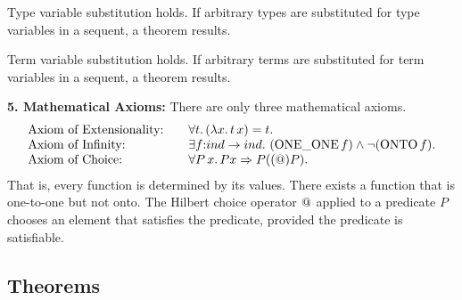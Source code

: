 \documentclass{llncs}
\def\op#1{{\hbox{#1}}} %
\def\tc{\hbox{:}}
\begin{document}
{{Type variable substitution holds.  If arbitrary types are substituted for type variables in a sequent, a theorem results.

Term variable substitution holds.  If arbitrary terms are substituted for term variables in a sequent, a theorem results.



\bigskip
{\bf 5. Mathematical Axioms:} There are only three mathematical axioms.
$$\begin{array}{lll}
\hbox{Axiom of Extensionality:} &\quad\forall t.\, (\lambda x.\, t\, x) = t.\\
\hbox{Axiom of Infinity:} &\quad\exists f\tc ind\to ind.\ (\op{ONE\_ONE}\,f) \land \neg(\op{ONTO}\, f).\\
\hbox{Axiom of Choice:}&\quad  \forall P\,x.\, P x \Rightarrow  P((\hbox{@}) P).\\
\end{array}
$$
That is, every function is determined by its values. There exists a function that is one-to-one but not onto.  The Hilbert choice operator $\hbox{@}$ applied to a predicate $P$ chooses an element that satisfies the predicate, provided the
predicate is satisfiable.


}} %
\bigskip

\subsection{Theorems}
\end{document}
